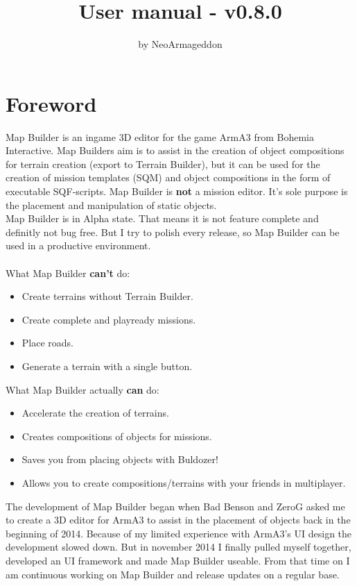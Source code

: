 \documentclass[english]{scrartcl}
\title{User manual - v0.8.0}
\author{by NeoArmageddon}
\date{}
\begin{document}
	
	\maketitle
	\newpage
	\setcounter{secnumdepth}{3} 
	\setcounter{tocdepth}{3} 
	
	\tableofcontents
	\newpage
	\section{Foreword}
	Map Builder is an ingame 3D editor for the game ArmA3 from Bohemia Interactive. Map Builders aim is to assist in the creation of object compositions for terrain creation (export to Terrain Builder), but it can be used for the creation of mission templates (SQM) and object compositions in the form of executable SQF-scripts. Map Builder is \textbf{not} a mission editor. It's sole purpose is the placement and manipulation of static objects.\\
	Map Builder is in Alpha state. That means it is not feature complete and definitly not bug free. But I try to polish every release, so Map Builder can be used in a productive environment.\\
	\\
	What Map Builder \textbf{can't} do:
	\begin{itemize}
		\item Create terrains without Terrain Builder.
		\item Create complete and playready missions.
		\item Place roads.
		\item Generate a terrain with a single button.
	\end{itemize}
	What Map Builder actually \textbf{can} do:
	\begin{itemize}
		\item Accelerate the creation of terrains.
		\item Creates compositions of objects for missions.
		\item Saves you from placing objects with Buldozer!
		\item Allows you to create compositions/terrains with your friends in multiplayer.
	\end{itemize}
	The development of Map Builder began when Bad Benson and ZeroG asked me to create a 3D editor for
	ArmA3 to assist in the placement of objects back in the beginning of 2014. Because of my limited experience with ArmA3's UI design the development slowed down. But in november 2014 I finally pulled myself together, developed an UI framework and made Map Builder useable. From that time on I am continuous working on Map Builder and release updates on a regular base.\\ 
	\newpage
\end{document}
